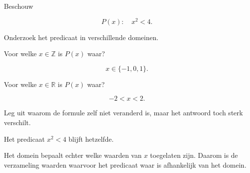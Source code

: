 \documentclass{ximera}
\begin{document}
\begin{oefening}{\oefU \ESS}

Beschouw

\[
P(x):\quad x^2<4.
\]

Onderzoek het predicaat in verschillende domeinen.

\begin{question}
Voor welke $x\in\mathbb{Z}$ is $P(x)$ waar?

\begin{oplossing}
\[
x\in\{-1,0,1\}.
\]
\end{oplossing}
\end{question}


\begin{question}
Voor welke $x\in\mathbb{R}$ is $P(x)$ waar?

\begin{oplossing}
\[
-2<x<2.
\]
\end{oplossing}
\end{question}


\begin{question}
Leg uit waarom de formule zelf niet veranderd is, maar het antwoord
toch sterk verschilt.

\begin{oplossing}
Het predicaat $x^2<4$ blijft hetzelfde.

Het domein bepaalt echter welke waarden van $x$ toegelaten zijn.
Daarom is de verzameling waarden waarvoor het predicaat waar is
afhankelijk van het domein.
\end{oplossing}
\end{question}

\end{oefening}
\end{document}
